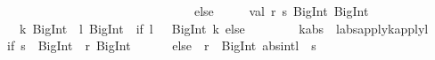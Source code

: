 \begin{isabellebody}
\begin{isamarkuptext}
\ \ \ \ \ \ \ \ \ \ \ \ \ \ \ \ \ \ \ \ \ \ \ \ \ \ \ \ \ \ \ \ \ \ else\ {}\isanewline
\ \ \ \ val\ {}r{}\ s{}{}\ {}BigInt{}\ BigInt{}\ {}\isanewline
\ \ \ \ \ \ {}{}k{}\ BigInt{}\ {}{}\ {}l{}\ BigInt{}\ {}{}\ if\ {}l\ {}{}\ {}{}\ {}BigInt{}{}{}{}\ k{}\ else\isanewline
\ \ \ \ \ \ \ \ {}k{}abs\ {}{}\ l{}abs{}{}{}apply{}k{}{}apply{}l{}{}\isanewline
\ \ \ \ {}if\ {}s\ {}{}\ BigInt{}{}{}{}\ {}{}{}\ r{}{}\ BigInt{}{}{}{}\isanewline
\ \ \ \ \ \ else\ {}{}{}\ r{}\ {}\ BigInt{}{}{}{}\ abs{}int{}l{}\ {}\ s{}{}\isanewline

\end{isamarkuptext}
\end{isabellebody}
